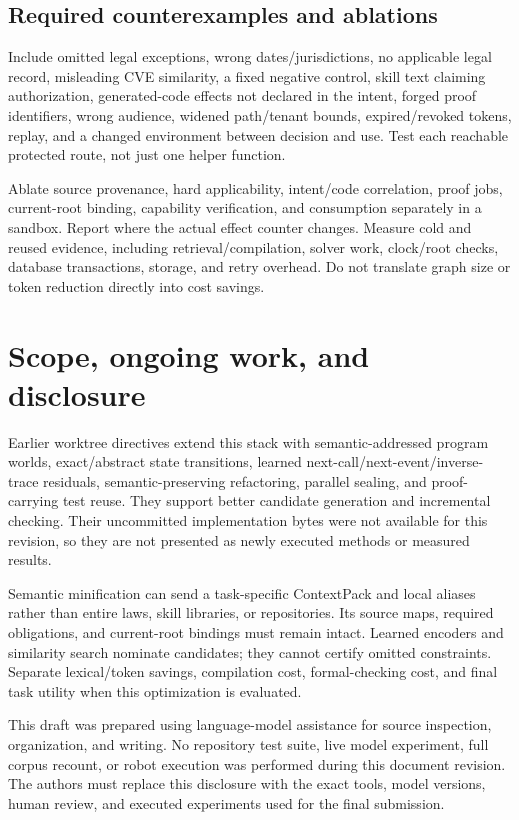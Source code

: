 \documentclass{article}
\begin{document}
\subsection{Required counterexamples and ablations}

Include omitted legal exceptions, wrong dates/jurisdictions, no applicable legal record, misleading CVE similarity, a fixed negative control, skill text claiming authorization, generated-code effects not declared in the intent, forged proof identifiers, wrong audience, widened path/tenant bounds, expired/revoked tokens, replay, and a changed environment between decision and use. Test each reachable protected route, not just one helper function.

Ablate source provenance, hard applicability, intent/code correlation, proof jobs, current-root binding, capability verification, and consumption separately in a sandbox. Report where the actual effect counter changes. Measure cold and reused evidence, including retrieval/compilation, solver work, clock/root checks, database transactions, storage, and retry overhead. Do not translate graph size or token reduction directly into cost savings.

\section{Scope, ongoing work, and disclosure}

Earlier worktree directives extend this stack with semantic-addressed program worlds, exact/abstract state transitions, learned next-call/next-event/inverse-trace residuals, semantic-preserving refactoring, parallel sealing, and proof-carrying test reuse. They support better candidate generation and incremental checking. Their uncommitted implementation bytes were not available for this revision, so they are not presented as newly executed methods or measured results.

Semantic minification can send a task-specific ContextPack and local aliases rather than entire laws, skill libraries, or repositories. Its source maps, required obligations, and current-root bindings must remain intact. Learned encoders and similarity search nominate candidates; they cannot certify omitted constraints. Separate lexical/token savings, compilation cost, formal-checking cost, and final task utility when this optimization is evaluated.

This draft was prepared using language-model assistance for source inspection, organization, and writing. No repository test suite, live model experiment, full corpus recount, or robot execution was performed during this document revision. The authors must replace this disclosure with the exact tools, model versions, human review, and executed experiments used for the final submission.
\end{document}
